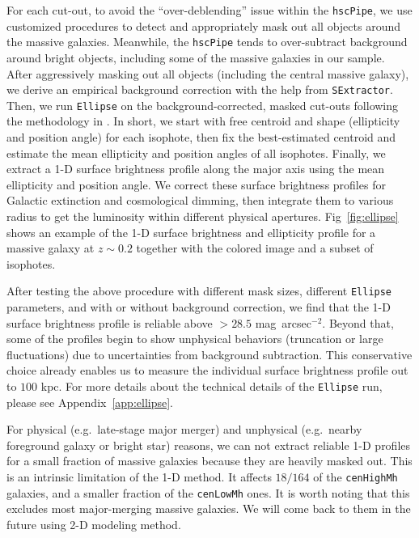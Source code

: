 \documentclass{emulateapj}
\def\sb{mag~arcsec$^{-2}$}
\def\rbcg{\texttt{cenHighMh}}
\def\nbcg{\texttt{cenLowMh}}
\begin{document}
\begin{CJK*}{UTF8}{gbsn}
    For each cut-out, to avoid the ``over-deblending'' issue within the 
    \texttt{hscPipe}, we use customized procedures to detect and appropriately mask 
    out all objects around the massive galaxies.
    Meanwhile, the \texttt{hscPipe} tends to over-subtract background around bright
    objects, including some of the massive galaxies in our sample. 
    After aggressively masking out all objects (including the central massive 
    galaxy), we derive an empirical background correction with the help from 
    \texttt{SExtractor}.
    Then, we run \texttt{Ellipse} on the background-corrected, masked cut-outs 
    following the methodology in \citep{Li2012}. 
    In short, we start with free centroid and shape (ellipticity and position angle) 
    for each isophote, then fix the best-estimated centroid and estimate the mean 
    ellipticity and position angles of all isophotes.  
    Finally, we extract a 1-D surface brightness profile along the major axis using 
    the mean ellipticity and position angle. 
    We correct these surface brightness profiles for Galactic extinction and 
    cosmological dimming, then integrate them to various radius to get the 
    luminosity within different physical apertures. 
    Fig~\ref{fig:ellipse} shows an example of the 1-D surface brightness and 
    ellipticity profile for a massive galaxy at $z\sim0.2$ together with the 
    colored image and a subset of isophotes.    

    After testing the above procedure with different mask sizes, different 
    \texttt{Ellipse} parameters, and with or without background correction, 
    we find that the 1-D surface brightness profile is reliable above 
    $>28.5$ \sb. 
    Beyond that, some of the profiles begin to show unphysical behaviors 
    (truncation or large fluctuations) due to uncertainties from background subtraction. 
    This conservative choice already enables us to measure the individual surface 
    brightness profile out to $100$ kpc. 
    For more details about the technical details of the \texttt{Ellipse} run, please 
    see Appendix~\ref{app:ellipse}.
    
    For physical (e.g.\ late-stage major merger) and unphysical (e.g.\ nearby foreground 
    galaxy or bright star) reasons, we can not extract reliable 1-D profiles for a small 
    fraction of massive galaxies because they are heavily masked out. 
    This is an intrinsic limitation of the 1-D method. 
    It affects $18/164$ of the \rbcg{} galaxies, and a smaller fraction of the \nbcg{} 
    ones. 
    It is worth noting that this excludes most major-merging massive galaxies. 
    We will come back to them in the future using 2-D modeling method.
    

\end{CJK*}
\end{document}
